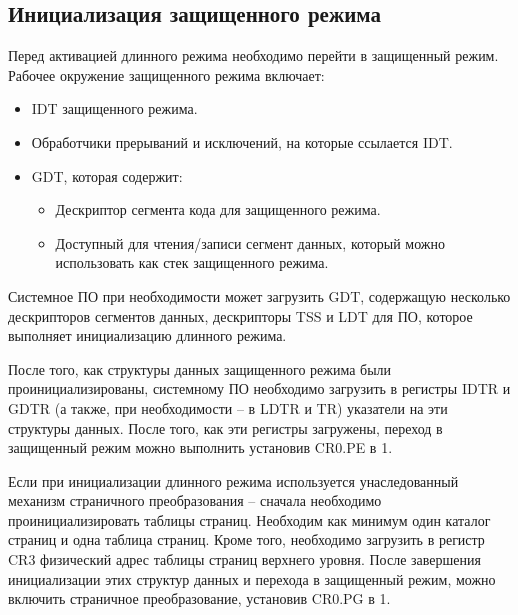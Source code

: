 \subsection{Инициализация защищенного режима}
Перед активацией длинного режима необходимо перейти в защищенный режим.
Рабочее окружение защищенного режима включает:
\begin{itemize}
\item IDT защищенного режима.
\item Обработчики прерываний и исключений, на которые ссылается IDT.
\item GDT, которая содержит:
	\begin{itemize}
	\item Дескриптор сегмента кода для защищенного режима.
	\item Доступный для чтения/записи сегмент данных, который можно использовать как стек защищенного режима.
	\end{itemize}
\end{itemize}

Системное ПО при необходимости может загрузить GDT, содержащую несколько дескрипторов сегментов данных,
дескрипторы TSS и LDT для ПО, которое выполняет инициализацию длинного режима.

После того, как структуры данных защищенного режима были проинициализированы, системному ПО необходимо
загрузить в регистры IDTR и GDTR (а также, при необходимости -- в LDTR и TR) указатели на эти структуры данных.
После того, как эти регистры загружены, переход в защищенный режим можно выполнить установив CR0.PE в 1.

Если при инициализации длинного режима используется унаследованный механизм страничного преобразования --
сначала необходимо проинициализировать таблицы страниц. Необходим как минимум один каталог страниц и одна
таблица страниц. Кроме того, необходимо загрузить в регистр CR3 физический адрес таблицы страниц верхнего
уровня. После завершения инициализации этих структур данных и перехода в защищенный режим, можно
включить страничное преобразование, установив CR0.PG в 1.

